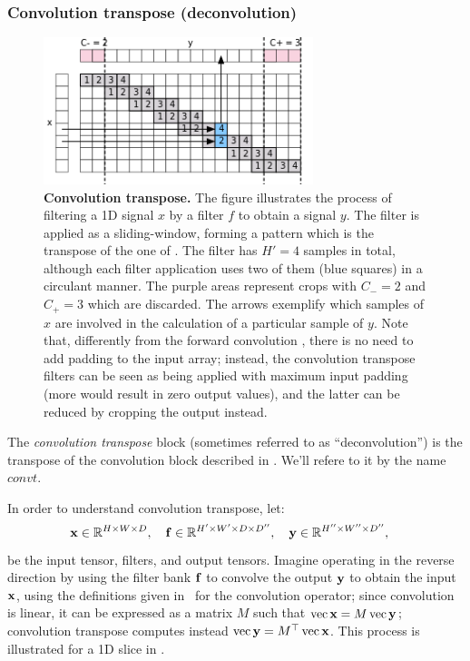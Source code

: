 \subsubsection{Convolution transpose (deconvolution)}\label{s:convt}

\begin{figure}[t]
	\centering
	\includegraphics[width=0.7\textwidth]{figures/svg/convt}
	\caption{\textbf{Convolution transpose.} The figure illustrates the process of filtering a 1D signal $x$ by a filter $f$ to obtain a signal $y$. The filter is applied as a sliding-window, forming a pattern which is the transpose of the one of . The filter has $H'=4$ samples in total, although each filter application uses two of them (blue squares) in a circulant manner. The purple areas represent crops with $C_-=2$ and $C_+=3$ which are discarded. The arrows exemplify which samples of $x$ are involved in the calculation of a particular sample of $y$. Note that, differently from the forward convolution , there is no need to add padding to the input array; instead, the convolution transpose filters can be seen as being applied with maximum input padding (more would result in zero output values), and the latter can be reduced by cropping the output instead.}\label{f:convt}
\end{figure}

The \emph{convolution transpose} block (sometimes referred to as ``deconvolution'') is the transpose of the convolution block described in . We'll refere to it by the name $convt$.

In order to understand convolution transpose, let:
\[
\mathbf{x}\in\mathbb{R}^{H \times W \times D}, \quad
\mathbf{f}\in\mathbb{R}^{H' \times W' \times D \times D''}, \quad
\mathbf{y}\in\mathbb{R}^{H'' \times W'' \times D''}, \quad
\]
be the input tensor, filters, and output tensors. Imagine operating in the reverse direction by using the filter bank $\mathbf{f}$ to convolve the output $\mathbf{y}$ to obtain the input $\mathbf{x}$, using the definitions given in~ for the convolution operator; since convolution is linear, it can be expressed as a matrix $M$ such that  $\operatorname{vec} \mathbf{x} = M \operatorname{vec}\mathbf{y}$; convolution transpose computes instead $\operatorname{vec} \mathbf{y} = M^\top \operatorname{vec} \mathbf{x}$. This process is illustrated for a 1D slice in .

